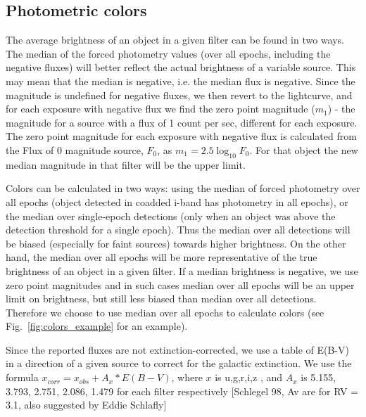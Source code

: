 \documentclass[fleqn,usenatbib]{mnras}  %
\begin{document}
\subsection{Photometric colors}

The average brightness of an object in  a given filter can be found in two ways. The median of the forced photometry values (over all epochs, including the negative fluxes)   will better reflect the actual brightness of a variable source. This may mean that the median is negative, i.e. the median flux is negative. Since the magnitude is undefined for negative fluxes, we then revert to the lightcurve, and for each exposure with negative flux we find the zero point magnitude ($m_1$) - the magnitude for a source with a flux of 1 count per sec, different for each exposure.  The zero point magnitude for each exposure with negative flux is calculated from the  Flux of 0 magnitude source,  $F_0$,  as  $m_{1} = 2.5 \log_{10}{F_{0}}$. For that object the new median magnitude in that filter will be the upper limit. 

Colors can be calculated in two ways: using the median of forced photometry over all epochs (object detected in coadded i-band has photometry in all epochs), or the median over single-epoch detections (only when an object was above the detection threshold for a single epoch).  
Thus the median over all detections will be biased (especially for faint sources) towards higher brightness.  On the other hand, the median over all epochs will be more representative of the true brightness of an object in a given filter.  If a median brightness is negative, we use zero point magnitudes and in such cases median over all epochs will be an upper limit on brightness, but still less biased than median over all detections. Therefore  we choose to use median over all epochs to calculate colors (see Fig.~\ref{fig:colors_example} for an example).  

Since the reported fluxes are not extinction-corrected, we use a table of E(B-V) in a direction of a given source to correct for the galactic extinction. We use the formula  $x_{corr}  = x_{obs} + A_{x} * E(B-V)$, where $x$ is  u,g,r,i,z , and $A_x$ is 5.155, 3.793, 2.751, 2.086, 1.479  for each filter respectively  [Schlegel 98, Av are for RV = 3.1, also suggested by Eddie Schlafly] 
\end{document}
